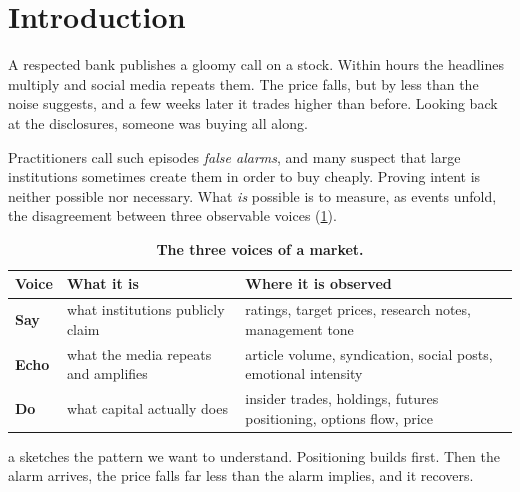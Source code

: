 \documentclass[11pt,a4paper]{article}
\theoremstyle{sci}
\theoremstyle{scidef}
\newcommand{\SAY}{\textcolor{say}{\textsf{\textbf{Say}}}}
\newcommand{\ECHO}{\textcolor{echo}{\textsf{\textbf{Echo}}}}
\newcommand{\DO}{\textcolor{do}{\textsf{\textbf{Do}}}}
\begin{document}
\newpage

\section{Introduction}\label{sec:intro}

A respected bank publishes a gloomy call on a stock. Within hours the headlines multiply and social media repeats them. The price falls, but by less than the noise suggests, and a few weeks later it trades higher than before. Looking back at the disclosures, someone was buying all along.

Practitioners call such episodes \emph{false alarms}, and many suspect that large institutions sometimes create them in order to buy cheaply. Proving intent is neither possible nor necessary. What \emph{is} possible is to measure, as events unfold, the disagreement between three observable voices (\cref{tab:voices}).

\begin{table}[h]
\centering
\caption{\textbf{The three voices of a market.}}
\label{tab:voices}
\small
\begin{tabularx}{0.92\linewidth}{@{}>{\raggedright}p{1.7cm}>{\raggedright}p{4.4cm}>{\raggedright\arraybackslash}X@{}}
\toprule
\textsf{Voice} & \textsf{What it is} & \textsf{Where it is observed} \\
\midrule
\SAY & what institutions publicly claim & ratings, target prices, research notes, management tone \\
\ECHO & what the media repeats and amplifies & article volume, syndication, social posts, emotional intensity \\
\DO & what capital actually does & insider trades, holdings, futures positioning, options flow, price \\
\bottomrule
\end{tabularx}
\end{table}

a sketches the pattern we want to understand. Positioning builds first. Then the alarm arrives, the price falls far less than the alarm implies, and it recovers.
\end{document}
